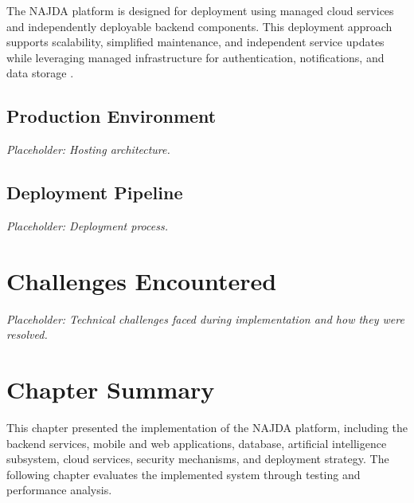 The NAJDA platform is designed for deployment using managed cloud services and independently deployable backend components. This deployment approach supports scalability, simplified maintenance, and independent service updates while leveraging managed infrastructure for authentication, notifications, and data storage \cite{firebase,postgresql}.

\subsection{Production Environment}

\textit{Placeholder: Hosting architecture.}

\subsection{Deployment Pipeline}

\textit{Placeholder: Deployment process.}


\section{Challenges Encountered}

\textit{Placeholder: Technical challenges faced during implementation and how they were resolved.}


\section{Chapter Summary}

This chapter presented the implementation of the NAJDA platform, including the backend services, mobile and web applications, database, artificial intelligence subsystem, cloud services, security mechanisms, and deployment strategy. The following chapter evaluates the implemented system through testing and performance analysis.